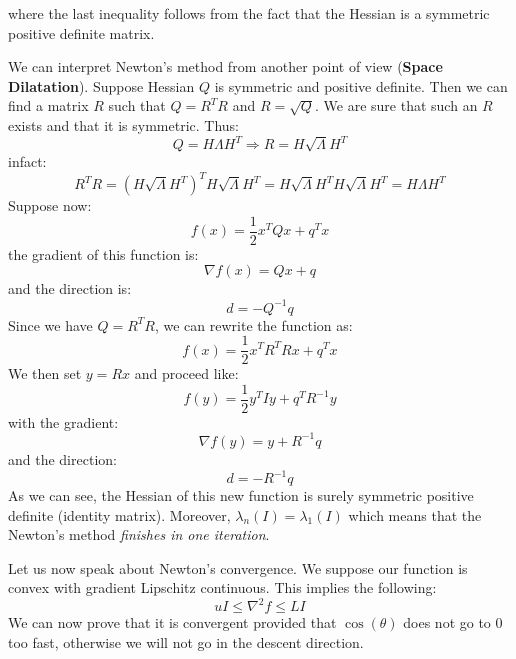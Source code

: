 where the last inequality follows from the fact that the Hessian is a symmetric positive definite matrix.
\par We can interpret Newton's method from another point of view (\textbf{Space Dilatation}). Suppose Hessian $Q$ is symmetric and positive definite. Then we can find a matrix $R$ such that $Q = R^TR$ and $R = \sqrt{Q}$. We are sure that such an $R$ exists and that it is symmetric. Thus:
\[
    Q = H \Lambda H^T \Rightarrow R = H \sqrt{\Lambda} H^T
\]
infact:
\[
    R^TR = (H \sqrt{\Lambda} H^T)^T H \sqrt{\Lambda} H^T = H \sqrt{\Lambda} H^T H \sqrt{\Lambda} H^T = H \Lambda H^T
\]
Suppose now:
\[
    f(x) = \frac{1}{2} x^T Q x + q^T x
\]
the gradient of this function is:
\[
    \nabla f(x) = Qx + q
\]
and the direction is:
\[
    d = -Q^{-1}q
\]
Since we have $Q = R^TR$, we can rewrite the function as:
\[
    f(x) = \frac{1}{2} x^T R^TR x + q^Tx
\]
We then set $y = Rx$ and proceed like:
\[
    f(y) = \frac{1}{2} y^T I y + q^T R^{-1}y
\]
with the gradient:
\[
    \nabla f(y) = y + R^{-1}q
\]
and the direction:
\[
    d = -R^{-1}q
\]
As we can see, the Hessian of this new function is surely symmetric positive definite (identity matrix). Moreover, $\lambda_n(I) = \lambda_1(I)$ which means that the Newton's method \textit{finishes in one iteration}. 
\par Let us now speak about Newton's convergence. We suppose our function is convex with gradient Lipschitz continuous. This implies the following:
\[
    uI \leq \nabla ^ 2 f \leq LI
\]
We can now prove that it is convergent provided that $\cos(\theta)$ does not go to 0 too fast, otherwise we will not go in the descent direction.
